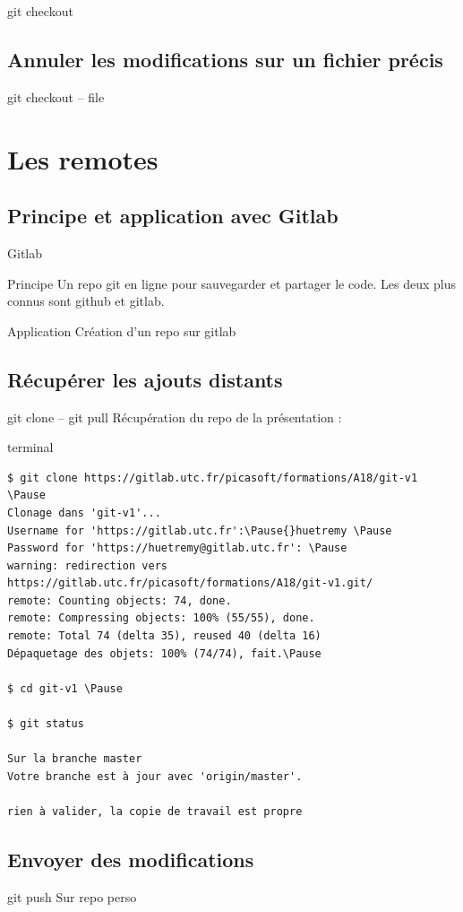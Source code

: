 \documentclass[usepdftitle=false]{beamer}
\newcommand{\Pause}{%
\ifdef{\Release}
  {\pause}
  {}
}
\begin{document}
\begin{frame}{git checkout}
\end{frame}

\subsection{Annuler les modifications sur un fichier précis}

\begin{frame}{git checkout -- file}
\end{frame}

\section{Les remotes}

\subsection{Principe et application avec Gitlab}

\begin{frame}{Gitlab}
	\begin{block}{Principe}
		Un repo git en ligne pour sauvegarder et partager le code. Les deux plus connus sont github et gitlab.
	\end{block}
	\begin{block}{Application}
		Création d'un repo sur gitlab
	\end{block}
\end{frame}

\subsection{Récupérer les ajouts distants}

\begin{frame}[fragile]{git clone -- git pull}
	Récupération du repo de la présentation :
	\begin{beamercolorbox}[rounded=true,shadow=true]{terminal}
		\begin{Verbatim}
$ git clone https://gitlab.utc.fr/picasoft/formations/A18/git-v1 \Pause
Clonage dans 'git-v1'...
Username for 'https://gitlab.utc.fr':\Pause{}huetremy \Pause
Password for 'https://huetremy@gitlab.utc.fr': \Pause
warning: redirection vers https://gitlab.utc.fr/picasoft/formations/A18/git-v1.git/
remote: Counting objects: 74, done.
remote: Compressing objects: 100% (55/55), done.
remote: Total 74 (delta 35), reused 40 (delta 16)
Dépaquetage des objets: 100% (74/74), fait.\Pause

$ cd git-v1 \Pause

$ git status

Sur la branche master
Votre branche est à jour avec 'origin/master'.

rien à valider, la copie de travail est propre
		\end{Verbatim}
	\end{beamercolorbox}
\end{frame}

\subsection{Envoyer des modifications}

\begin{frame}{git push}
	Sur repo perso
\end{frame}
\end{document}
